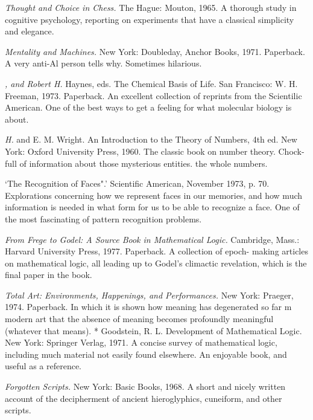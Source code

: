  {\sl Thought and Choice in Chess.} The Hague: Mouton, 1965. A thorough study in cognitive psychology, reporting on experiments that have a classical simplicity and elegance.

 {\sl Mentality and Machines.} New York: Doubleday, Anchor Books, 1971. Paperback. A very anti-Al person tells why. Sometimes hilarious.

 {\sl , and Robert H.} Haynes, eds. The Chemical Basis of Life. San Francisco: W. H. Freeman, 1973. Paperback. An excellent collection of reprints from the Scientilic American. One of the best ways to get a feeling for what molecular biology is about.

 {\sl H.} and E. M. Wright. An Introduction to the Theory of Numbers, 4th ed. New York: Oxford University Press, 1960. The classic book on number theory. Chock-full of information about those mysterious entities. the whole numbers.

 `The Recognition of Faces".' Scientific American, November 1973, p. 70. Explorations concerning how we represent faces in our memories, and how much information is needed in what form for us to be able to recognize a face. One of the most fascinating of pattern recognition problems.

 {\sl From Frege to Godel: A Source Book in Mathematical Logic.} Cambridge, Mass.: Harvard University Press, 1977. Paperback. A collection of epoch- making articles on mathematical logic, all leading up to Godel's climactic revelation, which is the final paper in the book.

 {\sl Total Art: Environments, Happenings, and Performances.} New York: Praeger, 1974. Paperback. In which it is shown how meaning has degenerated so far m modern art that the absence of meaning becomes profoundly meaningful (whatever that means). * Goodstein, R. L. Development of Mathematical Logic. New York: Springer Verlag, 1971. A concise survey of mathematical logic, including much material not easily found elsewhere. An enjoyable book, and useful as a reference.

 {\sl Forgotten Scripts.} New York: Basic Books, 1968. A short and nicely written account of the decipherment of ancient hieroglyphics, cuneiform, and other scripts.

